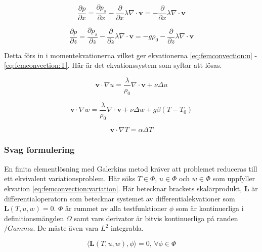 \begin{equation}
\label{eq:femconvection:partx}
\frac{\partial p}{\partial x} = \frac{\partial p_s}{\partial x} -
\frac{\partial}{\partial x} \lambda\nabla\cdot\mathbf{v} = -
\frac{\partial}{\partial x} \lambda\nabla\cdot\mathbf{v}
\end{equation}

\begin{equation}
\label{eq:femconvection:partz}
\frac{\partial p}{\partial z} = \frac{\partial p_s}{\partial z} -
\frac{\partial}{\partial z} \lambda\nabla\cdot\mathbf{v} =
-g\rho_0 - \frac{\partial}{\partial z} \lambda\nabla\cdot\mathbf{v}
\end{equation}

\noindent
Detta förs in i momentekvationerna vilket ger ekvationerna \eqref{eq:femconvection:u} -
\eqref{eq:femconvection:T}. Här är det ekvationssystem som syftar att lösas.

\begin{equation}
\label{eq:femconvection:u}
\mathbf{v}\cdot\nabla u =
\frac{\lambda}{\rho_0}\nabla\cdot\mathbf{v} +
\nu\Delta u
\end{equation}

\begin{equation}
\label{eq:femconvection:w}
\mathbf{v}\cdot\nabla w =
\frac{\lambda}{\rho_0}\nabla\cdot\mathbf{v} + \nu\Delta w +g\beta(T-T_0)
\end{equation}

\begin{equation}
\label{eq:femconvection:T}
\mathbf{v}\cdot\nabla T = \alpha\Delta T
\end{equation}

\subsubsection{Svag formulering}

En finita elementlösning med Galerkins metod kräver att problemet reduceras till
ett ekvivalent variationsproblem. Här söks $T\in\Phi$, $u\in\Phi$ och
$w\in\Phi$ som uppfyller ekvation \eqref{eq:femconvection:variation}. Här
betecknar brackets skalärprodukt, $\mathbf{L}$ är differentialoperatorn
som betecknar systemet av differentialekvationer som $\mathbf{L}(T,u,w) = 0$.
$\Phi$ är rummet av alla testfunktioner $\phi$ som är kontinuerliga i
definitionsmängden $\Omega$ samt vars derivator är bitvis kontinuerliga på randen
$/Gamma$. De måste även vara $L^2$ integrabla.

\begin{equation*}
\label{eq:femconvection:variation}
\langle \mathbf{L}(T,u,w), \phi \rangle = 0\mbox{,  } \forall \phi \in \Phi
\end{equation*}

